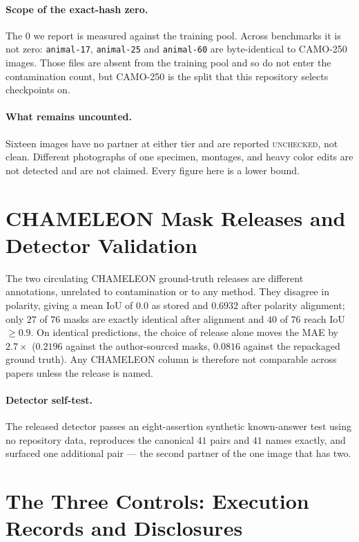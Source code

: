 \documentclass{article}
\begin{document}
\paragraph{Scope of the exact-hash zero.} The $0$ we report is measured against the training pool.
Across benchmarks it is not zero: \texttt{animal-17}, \texttt{animal-25} and \texttt{animal-60} are
byte-identical to CAMO-250 images. Those files are absent from the training pool and so do not enter
the contamination count, but CAMO-250 is the split that this repository selects checkpoints on.

\paragraph{What remains uncounted.} Sixteen images have no partner at either tier and are reported
\textsc{unchecked}, not clean. Different photographs of one specimen, montages, and heavy color edits
are not detected and are not claimed. Every figure here is a lower bound.


\section{CHAMELEON Mask Releases and Detector Validation}
\label{app:masks}

The two circulating CHAMELEON ground-truth releases are different annotations, unrelated to
contamination or to any method. They disagree in polarity, giving a mean IoU of $0.0$ as stored and
$0.6932$ after polarity alignment; only $27$ of $76$ masks are exactly identical after alignment and
$40$ of $76$ reach IoU $\geq 0.9$. On identical predictions, the choice of release alone moves the MAE by
$2.7\times$ ($0.2196$ against the author-sourced masks, $0.0816$ against the repackaged ground truth).
Any CHAMELEON column is therefore not comparable across papers unless the release is named.

\paragraph{Detector self-test.} The released detector passes an eight-assertion synthetic
known-answer test using no repository data, reproduces the canonical $41$ pairs and $41$ names exactly, and surfaced one additional pair --- the second partner of the one image that has two.

\section{The Three Controls: Execution Records and Disclosures}
\label{app:controls}
\end{document}
